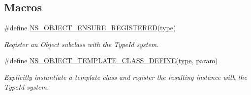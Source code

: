 \subsection*{Macros}
\begin{DoxyCompactItemize}
\item 
\#define \hyperlink{group__object_gada1b0bfc04abdba718621b5095c87678}{N\+S\+\_\+\+O\+B\+J\+E\+C\+T\+\_\+\+E\+N\+S\+U\+R\+E\+\_\+\+R\+E\+G\+I\+S\+T\+E\+R\+ED}(\hyperlink{visualizer-ideas_8txt_add98db9e15e2a58cf2b57623e7aa893a}{type})
\begin{DoxyCompactList}\small\item\em Register an Object subclass with the Type\+Id system. \end{DoxyCompactList}\item 
\#define \hyperlink{group__object_ga5e357e83d3947e972525eab919bd0e90}{N\+S\+\_\+\+O\+B\+J\+E\+C\+T\+\_\+\+T\+E\+M\+P\+L\+A\+T\+E\+\_\+\+C\+L\+A\+S\+S\+\_\+\+D\+E\+F\+I\+NE}(\hyperlink{visualizer-ideas_8txt_add98db9e15e2a58cf2b57623e7aa893a}{type},  param)
\begin{DoxyCompactList}\small\item\em Explicitly instantiate a template class and register the resulting instance with the Type\+Id system. \end{DoxyCompactList}\end{DoxyCompactItemize}
